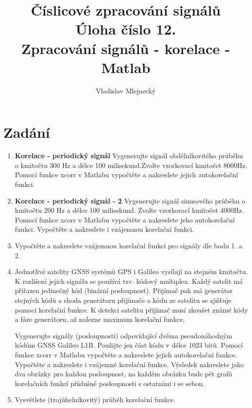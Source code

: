 \documentclass[11pt, a4paper]{article}
\author{Vladislav Mlejnecký}
\title{%
  Číslicové zpracování signálů\\
  \large Úloha číslo 12.\\
  Zpracování signálů - korelace - Matlab}
\begin{document}
    \maketitle
    
    \section{Zadání}
    
        \begin{enumerate}
        
            \item 
            \textbf{Korelace - periodický signál} Vygenerujte signál obdélníkovitého průběhu o kmitočtu 300 Hz a délce 100 milisekund.Zvolte
            vzorkovací kmitočet 8000Hz. Pomocí funkce xcorr v Matlabu vypočtěte a nakreslete jejich
            autokorelační funkci.

            \item
            \textbf{Korelace - periodický signál - 2} Vygenerujte signál sinusového průběhu o kmitočtu 200 Hz a délce 100 milisekund.
            Zvolte vzorkovací kmitočet 4000Hz. Pomocí funkce xcorr v Matlabu vypočtěte a nakreslete jeho
            autokorelační funkci. Vypočtěte a nakreslete i vzájemnou korelační funkci.

            \item
            Vypočtěte a nakreslete vzájemnou korelační funkci pro signály dle bodu 1. a 2.

            \item
            Jednotlivé satelity GNSS systémů GPS i Galileo vysílají na stejném kmitočtu. K rozlišení jejich
            signálu se používá tzv. kódový multiplex. Každý satelit má přiřazen jedinečný kód (binární
            posloupnost). Přijímač pak má generátor stejných kódů a shoda generátoru přijímače a kódu ze
            satelitu se zjišťuje pomocí korelační funkce. K detekci satelitu přijímač musí zkoušet známé kódy
            a fáze generátoru, až nalezne maximum korelační funkce.

            Vygenerujte signály (posloupnosti) odpovídající dvěma pseudonáhodným kódům GNSS Galileo
            L1B. Použijte jen část kódu v délce 1023 bitů. Pomocí funkce xcorr v Matlabu vypočtěte a
            nakreslete jejich autokorelační funkce. Vypočtěte a nakreslete i vzájemné korelační funkce.
            Výsledek nakreslete jako dva obrázky pro každou posloupnost, na každém obrázku bude pět
            grafů korelačních funkcí příslušné posloupnosti s ostatními i se sebou.
            
            \item
            Vysvětlete (trojúhelníkovitý) průběh korelační funkce.
        
        \end{enumerate}
        
\end{document}
